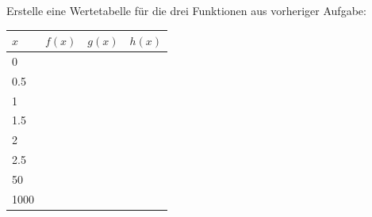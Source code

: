 \documentclass[11pt,oneside]{article}
\begin{document}
	\begin{aufgabe}
		Erstelle eine Wertetabelle für die drei Funktionen aus vorheriger Aufgabe:
		\begin{table}[H]
			\centering
			\begin{tabular}{p{2cm}|p{3cm}|p{3cm}|p{3cm}}
				$x$ &$f(x)$&$g(x)$ &  $h(x)$ \\\hline
				0 &   & & \\\hline
				0.5 &  &  &  \\\hline
				1 && & \\\hline
				1.5 & &&\\\hline
				2 & & &\\\hline
				2.5 & & &\\\hline
				50 & &&\\\hline
				1000  & &&\\
			\end{tabular}
		\end{table}
	\end{aufgabe}
\end{document}
